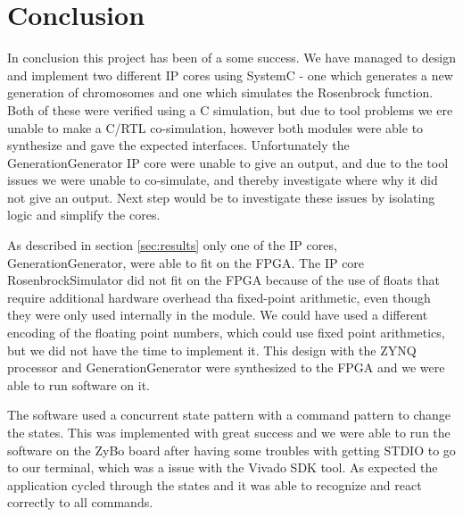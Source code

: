 \section{Conclusion}
In conclusion this project has been of a some success. We have managed to design and implement two different IP cores using SystemC - one which generates a new generation of chromosomes and one which simulates the Rosenbrock function. Both of these were verified using a C simulation, but due to tool problems we ere unable to make a C/RTL co-simulation, however both modules were able to synthesize and gave the expected interfaces. Unfortunately the GenerationGenerator IP core were unable to give an output, and due to the tool issues we were unable to co-simulate, and thereby investigate where why it did not give an output. Next step would be to investigate these issues by isolating logic and simplify the cores.

As described in section \ref{sec:results} only one of the IP cores, GenerationGenerator, were able to fit on the FPGA. The IP core RosenbrockSimulator did not fit on the FPGA because of the use of floats that require additional hardware overhead tha fixed-point arithmetic, even though they were only used internally in the module. We could have used a different encoding of the floating point numbers, which could use fixed point arithmetics, but we did not have the time to implement it. This design with the ZYNQ processor and GenerationGenerator were synthesized to the FPGA and we were able to run software on it.

The software used a concurrent state pattern with a command pattern to change the states. This was implemented with great success and we were able to run the software on the ZyBo board after having some troubles with getting STDIO to go to our terminal, which was a issue with the Vivado SDK tool. As expected the application cycled through the states and it was able to recognize and react correctly to all commands.
